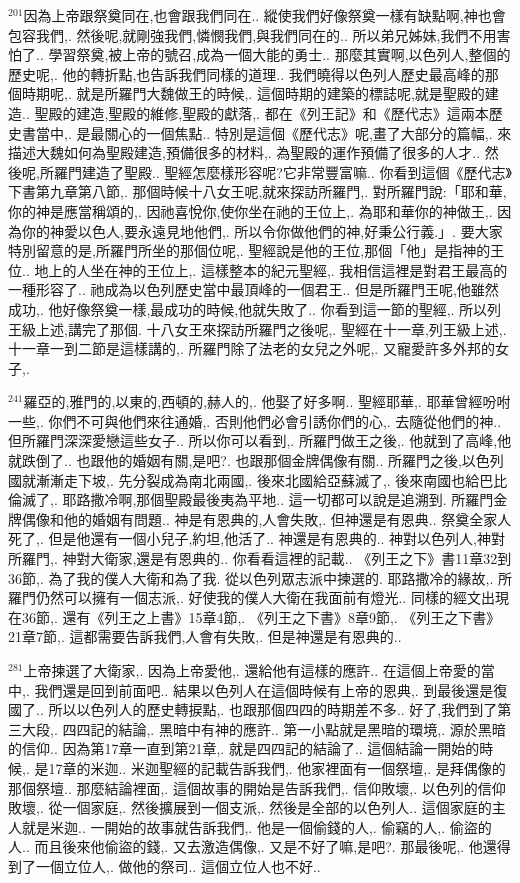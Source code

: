 \documentclass{book}
\begin{document}
$^{201}$因為上帝跟祭奠同在,也會跟我們同在..
縱使我們好像祭奠一樣有缺點啊,神也會包容我們,.
然後呢,就剛強我們,憐憫我們,與我們同在的..
所以弟兄姊妹,我們不用害怕了..
學習祭奠,被上帝的號召,成為一個大能的勇士..
那麼其實啊,以色列人,整個的歷史呢,.
他的轉折點,也告訴我們同樣的道理..
我們曉得以色列人歷史最高峰的那個時期呢,.
就是所羅門大魏做王的時候,.
這個時期的建築的標誌呢,就是聖殿的建造..
聖殿的建造,聖殿的維修,聖殿的獻落,.
都在《列王記》和《歷代志》這兩本歷史書當中,.
是最關心的一個焦點..
特別是這個《歷代志》呢,畫了大部分的篇幅,.
來描述大魏如何為聖殿建造,預備很多的材料,.
為聖殿的運作預備了很多的人才..
然後呢,所羅門建造了聖殿..
聖經怎麼樣形容呢?它非常豐富嘛..
你看到這個《歷代志》下書第九章第八節,.
那個時候十八女王呢,就來探訪所羅門,.
對所羅門說:「耶和華,你的神是應當稱頌的,.
因祂喜悅你,使你坐在祂的王位上,.
為耶和華你的神做王,.
因為你的神愛以色人,要永遠見地他們,.
所以令你做他們的神,好秉公行義.」.
要大家特別留意的是,所羅門所坐的那個位呢,.
聖經說是他的王位,那個「他」是指神的王位..
地上的人坐在神的王位上,.
這樣整本的紀元聖經,.
我相信這裡是對君王最高的一種形容了..
祂成為以色列歷史當中最頂峰的一個君王..
但是所羅門王呢,他雖然成功,.
他好像祭奠一樣,最成功的時候,他就失敗了..
你看到這一節的聖經,.
所以列王級上述,講完了那個.
十八女王來探訪所羅門之後呢,.
聖經在十一章,列王級上述,.
十一章一到二節是這樣講的,.
所羅門除了法老的女兒之外呢,.
又寵愛許多外邦的女子,.

$^{241}$羅亞的,雅門的,以東的,西頓的,赫人的,.
他娶了好多啊..
聖經耶華,.
耶華曾經吩咐一些,.
你們不可與他們來往通婚,.
否則他們必會引誘你們的心,.
去隨從他們的神..
但所羅門深深愛戀這些女子..
所以你可以看到,.
所羅門做王之後,.
他就到了高峰,他就跌倒了..
也跟他的婚姻有關,是吧?.
也跟那個金牌偶像有關..
所羅門之後,以色列國就漸漸走下坡,.
先分裂成為南北兩國,.
後來北國給亞蘇滅了,.
後來南國也給巴比倫滅了,.
耶路撒冷啊,那個聖殿最後夷為平地..
這一切都可以說是追溯到.
所羅門金牌偶像和他的婚姻有問題..
神是有恩典的,人會失敗,.
但神還是有恩典..
祭奠全家人死了,.
但是他還有一個小兒子,約坦,他活了..
神還是有恩典的..
神對以色列人,神對所羅門,.
神對大衛家,還是有恩典的..
你看看這裡的記載..
《列王之下》書11章32到36節,.
為了我的僕人大衛和為了我.
從以色列眾志派中揀選的.
耶路撒冷的緣故,.
所羅門仍然可以擁有一個志派,.
好使我的僕人大衛在我面前有燈光..
同樣的經文出現在36節,.
還有《列王之上書》15章4節,.
《列王之下書》8章9節,.
《列王之下書》21章7節,.
這都需要告訴我們,人會有失敗,.
但是神還是有恩典的..

$^{281}$上帝揀選了大衛家,.
因為上帝愛他,.
還給他有這樣的應許..
在這個上帝愛的當中,.
我們還是回到前面吧..
結果以色列人在這個時候有上帝的恩典,.
到最後還是復國了..
所以以色列人的歷史轉捩點,.
也跟那個四四的時期差不多..
好了,我們到了第三大段,.
四四記的結論,.
黑暗中有神的應許..
第一小點就是黑暗的環境,.
源於黑暗的信仰..
因為第17章一直到第21章,.
就是四四記的結論了..
這個結論一開始的時候,.
是17章的米迦..
米迦聖經的記載告訴我們,.
他家裡面有一個祭壇,.
是拜偶像的那個祭壇..
那麼結論裡面,.
這個故事的開始是告訴我們,.
信仰敗壞,.
以色列的信仰敗壞,.
從一個家庭,.
然後擴展到一個支派,.
然後是全部的以色列人..
這個家庭的主人就是米迦..
一開始的故事就告訴我們,.
他是一個偷錢的人,.
偷竊的人,.
偷盜的人..
而且後來他偷盜的錢,.
又去激造偶像,.
又是不好了嘛,是吧?.
那最後呢,.
他還得到了一個立位人,.
做他的祭司..
這個立位人也不好..
\end{document}
